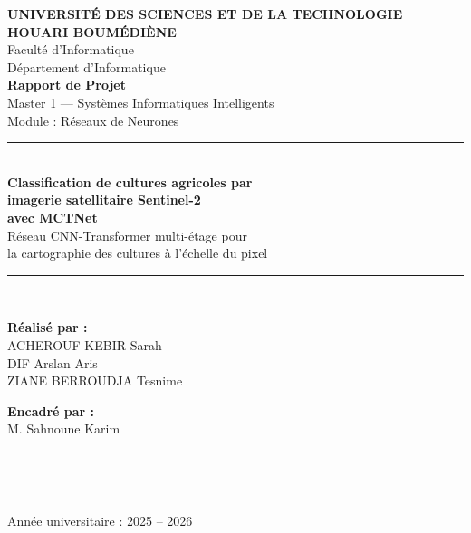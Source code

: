 
\begin{titlepage}
\begin{center}

{\large \textbf{UNIVERSITÉ DES SCIENCES ET DE LA TECHNOLOGIE\\
HOUARI BOUMÉDIÈNE}}\\[0.3cm]
{\large Faculté d'Informatique}\\[0.1cm]
{\large Département d'Informatique}\\[1.5cm]


{\Large \textbf{Rapport de Projet}}\\[0.2cm]
{\large Master 1 — Systèmes Informatiques Intelligents}\\[0.2cm]
{\large Module : Réseaux de Neurones}\\[2cm]

\noindent\rule{\textwidth}{0.5pt}\\[0.5cm]

{\LARGE \textbf{Classification de cultures agricoles par\\[0.3cm]
imagerie satellitaire Sentinel-2\\[0.3cm]
avec MCTNet}}\\[0.3cm]

{\large Réseau CNN-Transformer multi-étage pour\\
la cartographie des cultures à l'échelle du pixel}\\[0.5cm]

\noindent\rule{\textwidth}{0.5pt}\\[2cm]

\begin{minipage}[t]{0.45\textwidth}
\begin{flushleft}
\textbf{Réalisé par :}\\[0.3cm]
ACHEROUF KEBIR Sarah\\
DIF Arslan Aris\\
ZIANE BERROUDJA Tesnime
\end{flushleft}
\end{minipage}
\hfill
\begin{minipage}[t]{0.45\textwidth}
\begin{flushright}
\textbf{Encadré par :}\\[0.3cm]
M. Sahnoune Karim
\end{flushright}
\end{minipage}\\[1cm]

\noindent\rule{\textwidth}{0.5pt}\\[0.3cm]
{\large Année universitaire : 2025 -- 2026}

\end{center}
\end{titlepage}
